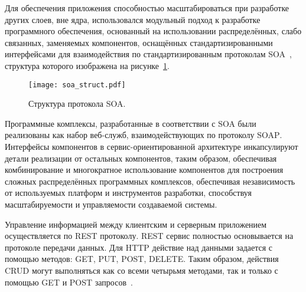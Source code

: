 Для обеспечения приложения способностью масштабироваться при разработке других слоев, вне ядра, использовался модульный подход к разработке программного обеспечения, основанный на использовании распределённых, слабо связанных, заменяемых компонентов, оснащённых стандартизированными интерфейсами для взаимодействия по стандартизированным протоколам SOA~\cite[с.~16\,--\,17]{sicp_2006_ru}, структура которого изображена на рисунке~\ref{fig:domain:bayes_net}.

\begin{figure}[ht]
\centering
  \texttt{[image: soa\_struct.pdf]}
  \caption{ Структура протокола SOA. }
  \label{fig:domain:bayes_net}
\end{figure}

Программные комплексы, разработанные в соответствии с \foreignlanguage{english}{SOA} были реализованы как набор веб-служб, взаимодействующих по протоколу \foreignlanguage{english}{SOAP}. Интерфейсы компонентов в сервис-ориентированной архитектуре инкапсулируют детали реализации от остальных компонентов, таким образом, обеспечивая комбинирование и многократное использование компонентов для построения сложных распределённых программных комплексов, обеспечивая независимость от используемых платформ и инструментов разработки, способствуя масштабируемости и управляемости создаваемой системы.

Управление информацией между клиентским и серверным приложением осуществляется по REST протоколу. REST сервис полностью основывается на протоколе передачи данных. Для HTTP действие над данными задается с помощью методов: GET, PUT, POST, DELETE. Таким образом, действия CRUD могут выполняться как со всеми четырьмя методами, так и только с помощью GET и POST запросов~\cite{restfull}.

